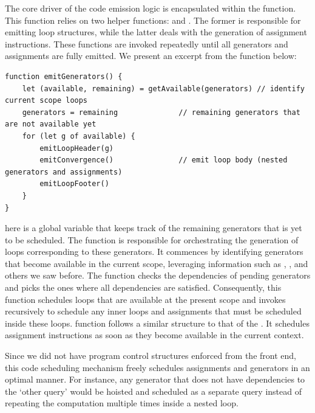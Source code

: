 \documentclass[runningheads]{llncs}
\begin{document}
The core driver of the code emission logic is encapsulated within
the  function. 
This function relies on two helper functions: 
and .
The former is responsible for emitting loop structures, while the
latter deals with the generation of assignment instructions.
These functions are invoked repeatedly until all generators and
assignments are fully emitted.
We present an excerpt from the  function below:

\begin{lstlisting}[style=JavaScript, columns=flexible]
function emitGenerators() {
    let (available, remaining) = getAvailable(generators) // identify current scope loops
    generators = remaining              // remaining generators that are not available yet
    for (let g of available) {
        emitLoopHeader(g)
        emitConvergence()               // emit loop body (nested generators and assignments)
        emitLoopFooter()
    }
}
\end{lstlisting}

 here is a global variable that keeps track of the
remaining generators that is yet to be scheduled.
The  function is responsible for orchestrating the
generation of loops corresponding to these generators.
It commences by identifying generators that become available in the
current scope, leveraging information such as ,
, and others we saw before.
The  function checks the dependencies of pending
generators and picks the ones where all dependencies are satisfied.
Consequently, this function schedules loops that are available at the
present scope and invokes  recursively to schedule
any inner loops and assignments that must be scheduled inside these loops.
 function follows a similar structure to that of
the .
It schedules assignment instructions as soon as they become available in
the current context.

Since we did not have program control structures enforced from the front end,
this code scheduling mechanism freely schedules assignments and generators
in an optimal manner.
For instance, any generator that does not have dependencies to the `other query'
would be hoisted and scheduled as a separate query instead of repeating the
computation multiple times inside a nested loop.


\end{document}
